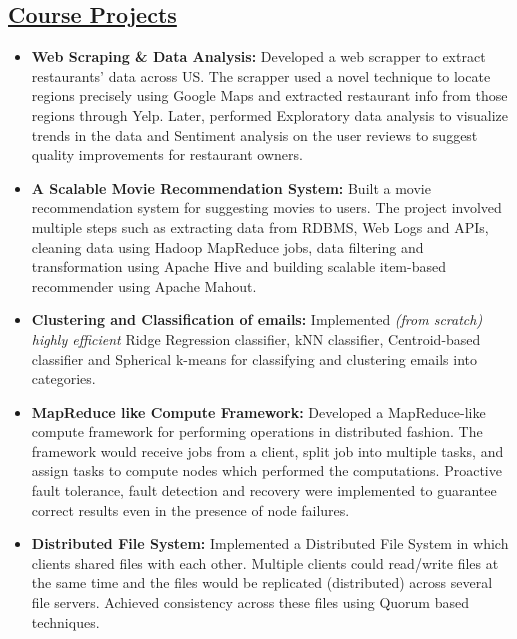 \documentclass[10pt]{article}
\begin{document}
\subsection*{\underline{Course Projects}}
\vspace{-0.1cm}
\begin{itemize}[leftmargin=0.15in]
\setlength{\itemsep}{0pt}%
\item {\bfseries Web Scraping \& Data Analysis:} Developed a web scrapper to extract restaurants' data across US. The scrapper used a novel technique to locate regions precisely using Google Maps and extracted restaurant info from those regions through Yelp. Later, performed Exploratory data analysis to visualize trends in the data and Sentiment analysis on the user reviews to suggest quality improvements for restaurant owners.

\item {\bfseries A Scalable Movie Recommendation System:} Built a movie recommendation system for suggesting movies to users. The project involved multiple steps such as extracting data from RDBMS, Web Logs and APIs, cleaning data using Hadoop MapReduce jobs, data filtering and transformation using Apache Hive and building scalable item-based recommender using Apache Mahout.

\item {\bfseries Clustering and Classification of emails:} Implemented  \textit{(from scratch) highly efficient} Ridge Regression classifier, kNN classifier, Centroid-based classifier and Spherical k-means for classifying and clustering emails into categories.

\item {\bfseries MapReduce like Compute Framework:} Developed a MapReduce-like compute framework for performing operations in distributed fashion. The framework would receive jobs from a client, split job into multiple tasks, and assign tasks to compute nodes which performed the computations. Proactive fault tolerance, fault detection and recovery were implemented to guarantee correct results even in the presence of node failures.

\item {\bfseries Distributed File System:} Implemented a Distributed File System in which clients shared files with each other. Multiple clients could read/write files at the same time and the files would be replicated (distributed) across several file servers. Achieved consistency across these files using Quorum based techniques.

\end{itemize}
\end{document}

